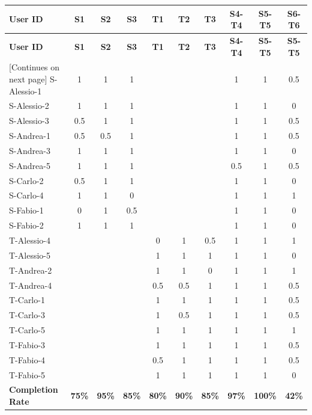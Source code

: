     \begin{tabularx}{\linewidth}{l|c|c|c|c|c|c|c|c|c}
    \toprule
    \textbf{User ID} & \textbf{S1} & \textbf{S2} & \textbf{S3} & \textbf{T1} & \textbf{T2} & \textbf{T3} & \textbf{S4-T4} & \textbf{S5-T5} & \textbf{S6-T6} \\
    \midrule
    \endfirsthead
    \toprule
    \textbf{User ID} & \textbf{S1} & \textbf{S2} & \textbf{S3} & \textbf{T1} & \textbf{T2} & \textbf{T3} & \textbf{S4-T4} & \textbf{S5-T5} & \textbf{S5-T5} \\
    \midrule
    \endhead
    \midrule
    \footnotesize [Continues on next page]
    \endfoot
    \bottomrule
    \endlastfoot
        S-Alessio-1 & 1 & 1 & 1 &  &  &  & 1 & 1 & 0.5 \\ \midrule
        S-Alessio-2 & 1 & 1 & 1 &  &  &  & 1 & 1 & 0 \\ \midrule
        S-Alessio-3 & 0.5 & 1 & 1 &  &  &  & 1 & 1 & 0.5 \\ \midrule
        S-Andrea-1 & 0.5 & 0.5 & 1 &  &  &  & 1 & 1 & 0.5 \\ \midrule
        S-Andrea-3 & 1 & 1 & 1 &  &  &  & 1 & 1 & 0 \\ \midrule
        S-Andrea-5 & 1 & 1 & 1 &  &  &  & 0.5 & 1 & 0.5 \\ \midrule
        S-Carlo-2 & 0.5 & 1 & 1 &  &  &  & 1 & 1 & 0 \\ \midrule
        S-Carlo-4 & 1 & 1 & 0 &  &  &  & 1 & 1 & 1 \\ \midrule
        S-Fabio-1 & 0 & 1 & 0.5 &  &  &  & 1 & 1 & 0 \\ \midrule
        S-Fabio-2 & 1 & 1 & 1 &  &  &  & 1 & 1 & 0 \\ \midrule
        T-Alessio-4 &  &  &  & 0 & 1 & 0.5 & 1 & 1 & 1 \\ \midrule
        T-Alessio-5 &  &  &  & 1 & 1 & 1 & 1 & 1 & 0 \\ \midrule
        T-Andrea-2 &  &  &  & 1 & 1 & 0 & 1 & 1 & 1 \\ \midrule
        T-Andrea-4 &  &  &  & 0.5 & 0.5 & 1 & 1 & 1 & 0.5 \\ \midrule
        T-Carlo-1 &  &  &  & 1 & 1 & 1 & 1 & 1 & 0.5 \\ \midrule
        T-Carlo-3 &  &  &  & 1 & 0.5 & 1 & 1 & 1 & 0.5 \\ \midrule
        T-Carlo-5 &  &  &  & 1 & 1 & 1 & 1 & 1 & 1 \\ \midrule
        T-Fabio-3 &  &  &  & 1 & 1 & 1 & 1 & 1 & 0.5 \\ \midrule
        T-Fabio-4 &  &  &  & 0.5 & 1 & 1 & 1 & 1 & 0.5 \\ \midrule
        T-Fabio-5 &  &  &  & 1 & 1 & 1 & 1 & 1 & 0 \\ \midrule
        \textbf{Completion Rate} & \textbf{75\%} & \textbf{95\%} & \textbf{85\%} & \textbf{80\%} & \textbf{90\%} & \textbf{85\%} & \textbf{97\%} & \textbf{100\%} & \textbf{42\%}
    \end{tabularx}

